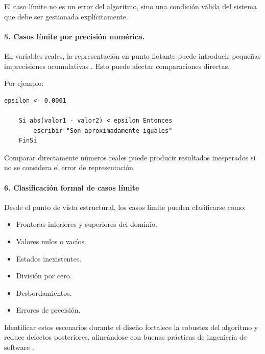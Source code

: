 \documentclass[12pt,twoside]{book}
\begin{document}
						El caso límite no es un error del algoritmo, sino una condición válida del sistema que debe ser gestionada explícitamente.
						
						\paragraph{5. Casos límite por precisión numérica.} En variables reales, la representación en punto flotante puede introducir pequeñas imprecisiones acumulativas \cite{Goldberg1991What,IEEE2019Standard754}. Esto puede afectar comparaciones directas.
						
						Por ejemplo:
						
						\begin{lstlisting}[style=upsamStyle, caption={Comparación segura de números reales.},
							label={lst:ComparacionReal}, basicstyle=\small\ttfamily]
	epsilon <- 0.0001
	
	Si abs(valor1 - valor2) < epsilon Entonces
		escribir "Son aproximadamente iguales"
	FinSi \end{lstlisting}
						
						Comparar directamente números reales puede producir resultados inesperados si no se considera el error de representación.
						
						\paragraph{6. Clasificación formal de casos límite}
						
						Desde el punto de vista estructural, los casos límite pueden clasificarse como:
						
						\begin{itemize}
							\item Fronteras inferiores y superiores del dominio.
							\item Valores nulos o vacíos.
							\item Estados inexistentes.
							\item División por cero.
							\item Desbordamientos.
							\item Errores de precisión.
						\end{itemize}
						
						Identificar estos escenarios durante el diseño fortalece la robustez del algoritmo y reduce defectos posteriores, alineándose con buenas prácticas de ingeniería de software \cite{SWEBOK2025Guide}.
						
\end{document}
